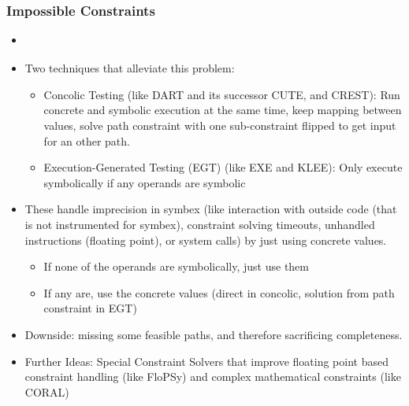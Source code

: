 \documentclass{article}
\begin{document}
\subsubsection{Impossible Constraints}
\begin{itemize}
    \item {}\cite{ReviewThreeDecades}
    \item Two techniques that alleviate this problem:
          \begin{itemize}
              \item Concolic Testing (like DART\cite{DART} and its successor CUTE\cite{CUTE}, and CREST\cite{CREST}): Run concrete and symbolic execution at the same time, keep mapping between values, solve path constraint with one sub-constraint flipped to get input for an other path. \cite{PreliminaryAssessment}
              \item Execution-Generated Testing (EGT)\cite{EGT} (like EXE\cite{EXE} and KLEE\cite{KLEE}): Only execute symbolically if any operands are symbolic
          \end{itemize}
    \item These handle imprecision in symbex (like interaction with outside code (that is not instrumented for symbex), constraint solving timeouts, unhandled instructions (floating point), or system calls) by just using concrete values.
          \begin{itemize}
              \item If none of the operands are symbolically, just use them
              \item If any are, use the concrete values (direct in concolic, solution from path constraint in EGT)
          \end{itemize}
    \item Downside: missing some feasible paths, and therefore sacrificing completeness.
    \item Further Ideas: Special Constraint Solvers that improve floating point based constraint handling (like FloPSy\cite{FloPSy}) and complex mathematical constraints (like CORAL\cite{CORAL})
\end{itemize}
\end{document}

